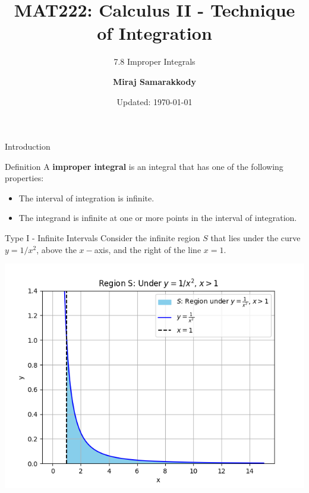 \documentclass{beamer}
\title{MAT222: Calculus II - Technique of Integration}
\subtitle{7.8 Improper Integrals}
\author{\textbf{Miraj Samarakkody}}
\institute{Tougaloo College}
\date{Updated: \today}
\begin{document}
\begin{frame}
    \titlepage
\end{frame}


\begin{frame}{Introduction}
    
    \begin{block}{Definition}
        A \textbf{improper integral} is an integral that has one of the following properties:
        \begin{itemize}
            \item The interval of integration is infinite.
            \item The integrand is infinite at one or more points in the interval of integration.
        \end{itemize}
    \end{block}
\end{frame}

\begin{frame}{Type I - Infinite Intervals}
    Consider the infinite region \(S\) that lies under the curve \(y=1/x^2\), above the \(x-\)axis, and the right of the line \(x=1\). 

    \includegraphics[scale=0.5]{figures/fig_2.png}
\end{frame}
\end{document}
